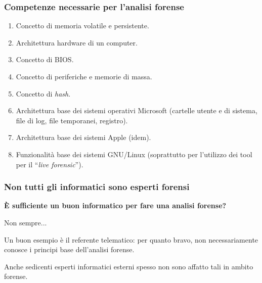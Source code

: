 \documentclass[11pt]{beamer}
\begin{document}
	\begin{frame}
		\frametitle{Competenze necessarie per l'analisi forense}
		
		\begin{enumerate}
			\item Concetto di memoria volatile e persistente.
			\item Architettura hardware di un computer.
			\item Concetto di BIOS.
			\item Concetto di periferiche e memorie di massa.
			\item Concetto di \textit{hash}.
			\item Architettura base dei sistemi operativi Microsoft (cartelle utente e di sistema, file di log, file temporanei, registro).
			\item Architettura base dei sistemi Apple (idem).
			\item Funzionalità base dei sistemi GNU/Linux (soprattutto per l'utilizzo dei tool per il ``\textit{live forensic}'').
			
		\end{enumerate}
		
	\end{frame}
	
	\begin{frame}
		\frametitle{Non tutti gli informatici sono esperti forensi}
		\begin{center}

		\textbf{\`{E} sufficiente un buon informatico per fare una analisi forense?}
		
		Non sempre...
		\end{center}
		
		Un buon esempio è il referente telematico: per quanto bravo, non necessariamente conosce i principi base dell'analisi forense. 
		
		Anche sedicenti esperti informatici esterni spesso non sono affatto tali in ambito forense.
		
	\end{frame}
	
\end{document}
